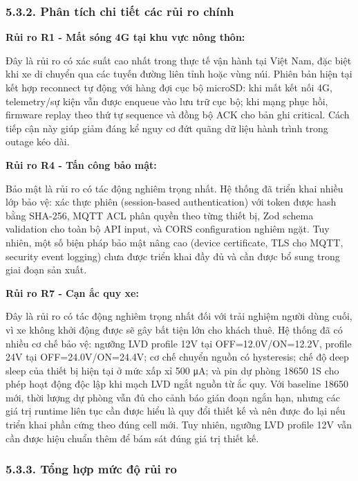 \documentclass[13pt,a4paper]{extarticle}
\renewcommand{\\}{\thesislongtableorignewline\hline}%
\begin{document}
\subsubsection{5.3.2. Phân tích chi tiết các rủi ro
chính}\label{532-phuxe2n-tuxedch-chi-tiux1ebft-cuxe1c-rux1ee7i-ro-chuxednh}

\textbf{Rủi ro R1 - Mất sóng 4G tại khu vực nông thôn:}

Đây là rủi ro có xác suất cao nhất trong thực tế vận hành tại Việt Nam,
đặc biệt khi xe di chuyển qua các tuyến đường liên tỉnh hoặc vùng núi.
Phiên bản hiện tại kết hợp reconnect tự động với hàng đợi cục bộ
microSD: khi mất kết nối 4G, telemetry/sự kiện vẫn được enqueue vào lưu
trữ cục bộ; khi mạng phục hồi, firmware replay theo thứ tự sequence và
đồng bộ ACK cho bản ghi critical. Cách tiếp cận này giúp giảm đáng kể
nguy cơ đứt quãng dữ liệu hành trình trong outage kéo dài.

\textbf{Rủi ro R4 - Tấn công bảo mật:}

Bảo mật là rủi ro có tác động nghiêm trọng nhất. Hệ thống đã triển khai
nhiều lớp bảo vệ: xác thực phiên (session-based authentication) với
token được hash bằng SHA-256, MQTT ACL phân quyền theo từng thiết bị,
Zod schema validation cho toàn bộ API input, và CORS configuration
nghiêm ngặt. Tuy nhiên, một số biện pháp bảo mật nâng cao (device
certificate, TLS cho MQTT, security event logging) chưa được triển khai
đầy đủ và cần được bổ sung trong giai đoạn sản xuất.

\textbf{Rủi ro R7 - Cạn ắc quy xe:}

Đây là rủi ro có tác động nghiêm trọng nhất đối với trải nghiệm người
dùng cuối, vì xe không khởi động được sẽ gây bất tiện lớn cho khách
thuê. Hệ thống đã có nhiều cơ chế bảo vệ: ngưỡng LVD profile 12V tại
OFF=12.0V/ON=12.2V, profile 24V tại OFF=24.0V/ON=24.4V; cơ chế chuyển
nguồn có hysteresis; chế độ deep sleep của thiết bị hiện tại ở mức xấp
xỉ 500 μA; và pin dự phòng 18650 1S cho phép hoạt động độc lập khi mạch
LVD ngắt nguồn từ ắc quy. Với baseline 18650 mới, thời lượng dự phòng
vẫn đủ cho cảnh báo gián đoạn ngắn hạn, nhưng các giá trị runtime liên
tục cần được hiểu là quy đổi thiết kế và nên được đo lại nếu triển khai
phần cứng theo đúng cell mới. Tuy nhiên, ngưỡng LVD profile 12V vẫn cần
được hiệu chuẩn thêm để bám sát đúng giá trị thiết kế.

\subsubsection{5.3.3. Tổng hợp mức độ rủi
ro}\label{533-tux1ed5ng-hux1ee3p-mux1ee9c-ux111ux1ed9-rux1ee7i-ro}
\end{document}
